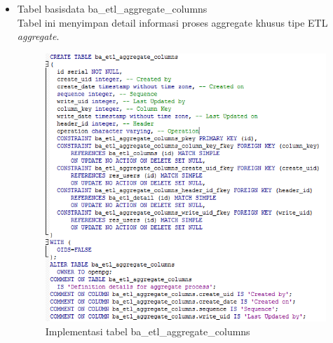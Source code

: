 \begin{itemize}
		\item Tabel basisdata ba\_etl\_aggregate\_columns\\
		Tabel ini menyimpan detail informasi proses aggregate khusus tipe ETL \textit{aggregate}.
		\begin{figure}[H]
		\centering
		\includegraphics[scale=0.5]{Gambar/tabel-ba-etl-aggregate-columns}
		\caption{Implementasi tabel ba\_etl\_aggregate\_columns}
		\end{figure}
	\end{itemize}
	
